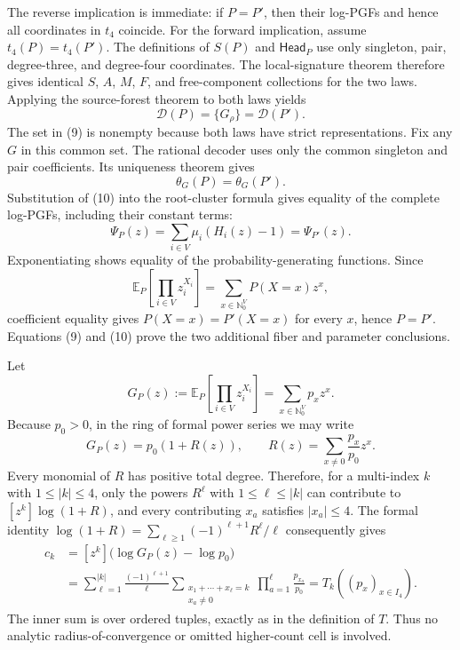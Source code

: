 The reverse implication is immediate: if \(P=P'\), then their log-PGFs and hence all coordinates in \(t_4\) coincide.  For the forward implication, assume \(t_4(P)=t_4(P')\).  The definitions of \(S(P)\) and \(\mathsf{Head}_P\) use only singleton, pair, degree-three, and degree-four coordinates.  The local-signature theorem therefore gives identical \(S\), \(A\), \(M\), \(F\), and free-component collections for the two laws.  Applying the source-forest theorem to both laws yields
\[
 \mathcal D(P)=\{G_\rho\}=\mathcal D(P').
\tag{9}
\]
The set in (9) is nonempty because both laws have strict representations.  Fix any \(G\) in this common set.  The rational decoder uses only the common singleton and pair coefficients.  Its uniqueness theorem gives
\[
 \theta_G(P)=\theta_G(P').
\tag{10}
\]
Substitution of (10) into the root-cluster formula gives equality of the complete log-PGFs, including their constant terms:
\[
 \Psi_P(z)=\sum_{i\in V}\mu_i(H_i(z)-1)=\Psi_{P'}(z).
\]
Exponentiating shows equality of the probability-generating functions.  Since
\[
 \mathbb E_P\!\left[\prod_{i\in V}z_i^{X_i}\right]
 =\sum_{x\in\mathbb N_0^V}P(X=x)z^x,
\]
coefficient equality gives \(P(X=x)=P'(X=x)\) for every \(x\), hence \(P=P'\).  Equations (9) and (10) prove the two additional fiber and parameter conclusions.

Let
\[
 G_P(z):=\mathbb E_P\!\left[\prod_{i\in V}z_i^{X_i}\right]
 =\sum_{x\in\mathbb N_0^V}p_xz^x.
\]
Because \(p_0>0\), in the ring of formal power series we may write
\[
 G_P(z)=p_0(1+R(z)),\qquad
 R(z)=\sum_{x\ne0}\frac{p_x}{p_0}z^x.
\]
Every monomial of \(R\) has positive total degree.  Therefore, for a multi-index \(k\) with \(1\le |k|\le4\), only the powers \(R^\ell\) with \(1\le\ell\le |k|\) can contribute to \([z^k]\log(1+R)\), and every contributing \(x_a\) satisfies \(|x_a|\le4\).  The formal identity \(\log(1+R)=\sum_{\ell\ge1}(-1)^{\ell+1}R^\ell/\ell\) consequently gives
\[
\begin{aligned}
 c_k
 &=[z^k]\bigl(\log G_P(z)-\log p_0\bigr)\\
 &=\sum_{\ell=1}^{|k|}\frac{(-1)^{\ell+1}}{\ell}
   \sum_{\substack{x_1+\cdots+x_\ell=k\\x_a\ne0}}
   \prod_{a=1}^{\ell}\frac{p_{x_a}}{p_0}
 =T_k((p_x)_{x\in I_4}).
\end{aligned}
\tag{11}
\]
The inner sum is over ordered tuples, exactly as in the definition of \(T\).  Thus no analytic radius-of-convergence or omitted higher-count cell is involved.

